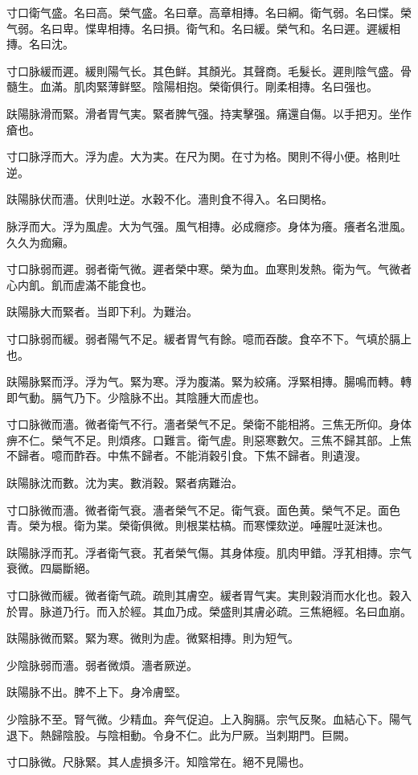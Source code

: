 寸口衛气盛。名曰高。榮气盛。名曰章。高章相摶。名曰綱。衛气弱。名曰惵。榮气弱。名曰卑。惵卑相摶。名曰損。衛气和。名曰緩。榮气和。名曰遲。遲緩相摶。名曰沈。

寸口脉緩而遲。緩則陽气长。其色鲜。其顏光。其聲商。毛髮长。遲則陰气盛。骨髓生。血滿。肌肉緊薄鲜堅。陰陽相抱。榮衛俱行。剛柔相摶。名曰强也。

趺陽脉滑而緊。滑者胃气実。緊者脾气强。持実擊强。痛還自傷。以手把刃。坐作瘡也。

寸口脉浮而大。浮为虗。大为実。在尺为関。在寸为格。関則不得小便。格則吐逆。

趺陽脉伏而濇。伏則吐逆。水穀不化。濇則食不得入。名曰関格。

脉浮而大。浮为風虗。大为气强。風气相摶。必成癮疹。身体为癢。癢者名泄風。久久为痂癩。

寸口脉弱而遲。弱者衛气微。遲者榮中寒。榮为血。血寒則发熱。衛为气。气微者心内飢。飢而虗滿不能食也。

趺陽脉大而緊者。当即下利。为難治。

寸口脉弱而緩。弱者陽气不足。緩者胃气有餘。噫而吞酸。食卒不下。气填於膈上也。

趺陽脉緊而浮。浮为气。緊为寒。浮为腹滿。緊为絞痛。浮緊相摶。腸鳴而轉。轉即气動。膈气乃下。少陰脉不出。其陰腫大而虗也。

寸口脉微而濇。微者衛气不行。濇者榮气不足。榮衛不能相將。三焦无所仰。身体痹不仁。榮气不足。則煩疼。口難言。衛气虗。則惡寒數欠。三焦不歸其部。上焦不歸者。噫而酢吞。中焦不歸者。不能消穀引食。下焦不歸者。則遺溲。

趺陽脉沈而數。沈为実。數消穀。緊者病難治。

寸口脉微而濇。微者衛气衰。濇者榮气不足。衛气衰。面色黄。榮气不足。面色青。榮为根。衛为枼。榮衛俱微。則根枼枯槁。而寒慄欬逆。唾腥吐涎沫也。

趺陽脉浮而芤。浮者衛气衰。芤者榮气傷。其身体瘦。肌肉甲錯。浮芤相摶。宗气衰微。四屬斷絕。

寸口脉微而緩。微者衛气疏。疏則其膚空。緩者胃气実。実則穀消而水化也。穀入於胃。脉道乃行。而入於經。其血乃成。榮盛則其膚必疏。三焦絕經。名曰血崩。

趺陽脉微而緊。緊为寒。微則为虗。微緊相摶。則为短气。

少陰脉弱而濇。弱者微煩。濇者厥逆。

趺陽脉不出。脾不上下。身冷膚堅。

少陰脉不至。腎气微。少精血。奔气促迫。上入胸膈。宗气反聚。血結心下。陽气退下。熱歸陰股。与陰相動。令身不仁。此为尸厥。当刺期門。巨闕。

寸口脉微。尺脉緊。其人虗損多汗。知陰常在。絕不見陽也。

